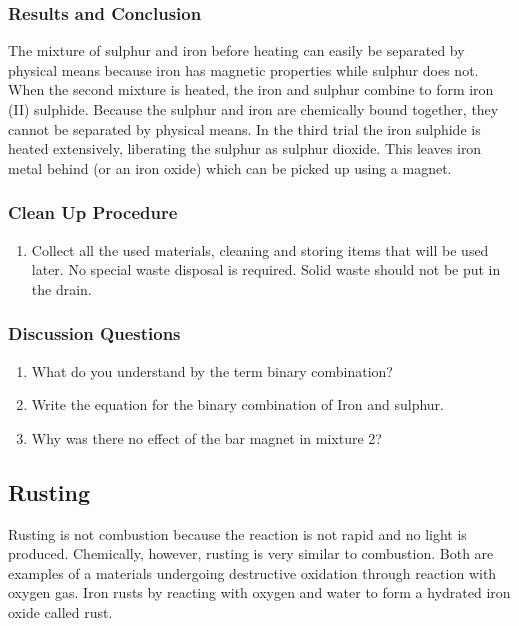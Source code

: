 \subsubsection*{Results and Conclusion}
The mixture of sulphur and iron before heating can easily be separated by physical means because iron has magnetic properties while sulphur does not. When the second mixture is heated, the iron and sulphur combine to form iron (II) sulphide. Because the sulphur and iron are chemically bound together, they cannot be separated by physical means. In the third trial the iron sulphide is heated extensively, liberating the sulphur as sulphur dioxide. This leaves iron metal behind (or an iron oxide) which can be picked up using a magnet.

\subsubsection*{Clean Up Procedure}
\begin{enumerate}
\item{Collect all the used materials, cleaning and storing items that will be used later. No special waste disposal is required. Solid waste should not be put in the drain.}
\end{enumerate}

\subsubsection*{Discussion Questions}
\begin{enumerate}
\item{What do you understand by the term binary combination?}
\item{Write the equation for the binary combination of Iron and sulphur.}
\item{Why was there no effect of the bar magnet in mixture 2?}
\end{enumerate}



\subsection{Rusting}

Rusting is not combustion because the reaction is not rapid and no light is produced. Chemically, however, rusting is very similar to combustion. Both are examples of a materials undergoing destructive oxidation through reaction with oxygen gas. Iron rusts by reacting with oxygen and water to form a hydrated iron oxide called rust.

